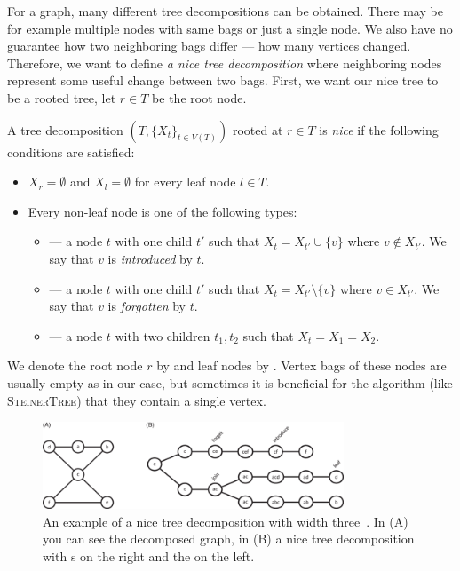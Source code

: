 For a graph, many different tree decompositions can be obtained.
There may be for example multiple nodes with same bags or just a single node.
We also have no guarantee how two neighboring bags differ --- how many vertices changed.
Therefore, we want to define \emph{a nice tree decomposition} where neighboring nodes
represent some useful change between two bags.
First, we want our nice tree to be a rooted tree,
let \( r \in T \) be the root node.
%
\begin{definition}
	A tree decomposition \newline
	\( (T, {\{X_t\}}_{t \in V ( T )}) \) rooted at \( r \in T \)
	is \emph{nice} if the following conditions are satisfied:
	\begin{itemize}
		\item \( X_r = \emptyset \) and \( X_l = \emptyset \) for every leaf node \( l \in T \).
		\item Every non-leaf node is one of the following types:
		      \begin{itemize}
			      \item \IntroduceVertexNode{} --- a node \( t \) with one child \( t' \)
			            such that \( X_t = X_{t'} \cup \{v\} \) where \( v \not\in X_{t'} \).
			            We say that \( v \) is \emph{introduced} by \( t \).
			      \item \ForgetVertexNode{} --- a node \( t \) with one child \( t' \)
			            such that \( X_t = X_{t'} \setminus \{v\} \) where \( v \in X_{t'} \).
			            We say that \( v \) is \emph{forgotten} by \( t \).
			      \item \JoinNode{} --- a node \( t \) with two children \( t_1, t_2 \)
			            such that \( X_t = X_1 = X_2 \).
		      \end{itemize}
	\end{itemize}
	We denote the root node \( r \) by \RootNode{} and leaf nodes by \LeafNode{}.
	Vertex bags of these nodes are usually empty as in our case,
	but sometimes it is beneficial
	for the algorithm (like \textsc{SteinerTree}) that they contain a single vertex.
\end{definition}
%
\begin{figure}[ht]
	\begin{center}
		\includegraphics[width=0.80\textwidth]{./assets/nice_tree_decomposition.png}
	\end{center}
	\caption[Nice tree decomposition]{An example of a nice tree decomposition with width three~\cite{nice_tree_decomposition_img}.
		In (A) you can see the decomposed graph, in (B) a nice tree decomposition
		with \LeafNode{}s on the right and the \RootNode{} on the left.
	}%
	\label{fig:nice_tree_decomposition}
\end{figure}

